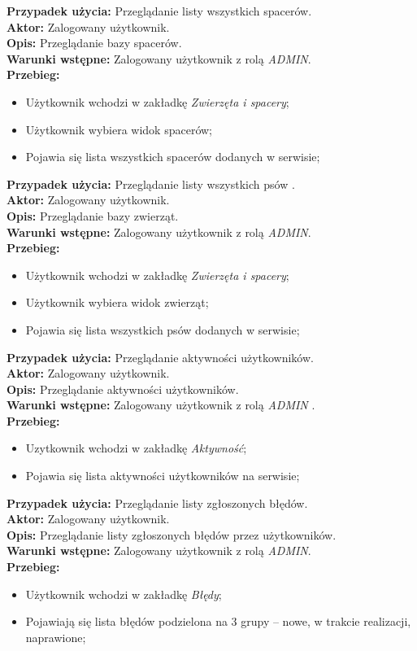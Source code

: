 \noindent
\textbf{Przypadek użycia:} Przeglądanie listy wszystkich spacerów. \\
\textbf{Aktor:} Zalogowany użytkownik. \\
\textbf{Opis:} Przeglądanie bazy spacerów. \\
\textbf{Warunki wstępne:} Zalogowany użytkownik z rolą \textit{ADMIN}. \\
\textbf{Przebieg:}
\begin{itemize}
    \item Użytkownik wchodzi w zakładkę \textit{Zwierzęta i spacery};
    \item Użytkownik wybiera widok spacerów;
    \item Pojawia się lista wszystkich spacerów dodanych w serwisie;
\end{itemize}

\noindent
\textbf{Przypadek użycia:} Przeglądanie listy wszystkich psów . \\
\textbf{Aktor:} Zalogowany użytkownik. \\
\textbf{Opis:} Przeglądanie bazy zwierząt. \\
\textbf{Warunki wstępne:} Zalogowany użytkownik z rolą \textit{ADMIN}. \\
\textbf{Przebieg:}
\begin{itemize}
    \item Użytkownik wchodzi w zakładkę \textit{Zwierzęta i spacery};
    \item Użytkownik wybiera widok zwierząt;
    \item Pojawia się lista wszystkich psów dodanych w serwisie;
\end{itemize}

\noindent
\textbf{Przypadek użycia:} Przeglądanie aktywności użytkowników. \\
\textbf{Aktor:} Zalogowany użytkownik. \\
\textbf{Opis:} Przeglądanie aktywności użytkowników. \\
\textbf{Warunki wstępne:} Zalogowany użytkownik z rolą \textit{ADMIN} . \\
\textbf{Przebieg:}
\begin{itemize}
    \item Uzytkownik wchodzi w zakładkę \textit{Aktywność};
    \item Pojawia się lista aktywności użytkowników na serwisie;
\end{itemize}

\noindent
\textbf{Przypadek użycia:} Przeglądanie listy zgłoszonych błędów. \\
\textbf{Aktor:} Zalogowany użytkownik. \\
\textbf{Opis:} Przeglądanie listy zgłoszonych błędów przez użytkowników. \\
\textbf{Warunki wstępne:} Zalogowany użytkownik z rolą \textit{ADMIN}. \\
\textbf{Przebieg:}
\begin{itemize}
    \item Użytkownik wchodzi w zakładkę \textit{Błędy};
    \item Pojawiają się lista błędów podzielona na 3 grupy -- nowe, w trakcie realizacji, naprawione;
\end{itemize}

